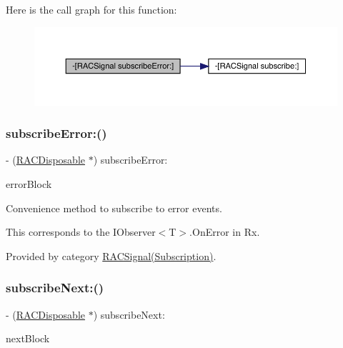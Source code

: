 Here is the call graph for this function\+:\nopagebreak
\begin{figure}[H]
\begin{center}
\leavevmode
\includegraphics[width=350pt]{interface_r_a_c_signal_a6e792da9c8499ad5791e14bd126e99cb_cgraph}
\end{center}
\end{figure}
\mbox{\label{interface_r_a_c_signal_a6e792da9c8499ad5791e14bd126e99cb}} 
\subsubsection{\texorpdfstring{subscribe\+Error\+:()}{subscribeError:()}\hspace{0.1cm}{\footnotesize\ttfamily [3/3]}}
{\footnotesize\ttfamily -\/ (\mbox{\hyperlink{interface_r_a_c_disposable}{R\+A\+C\+Disposable}} $\ast$) subscribe\+Error\+: \begin{DoxyParamCaption}\item[{(void($^\wedge$)(N\+S\+Error $\ast$error))}]{error\+Block }\end{DoxyParamCaption}}

Convenience method to subscribe to {\ttfamily error} events.

This corresponds to the {\ttfamily I\+Observer$<$T$>$.On\+Error} in Rx. 

Provided by category \mbox{\hyperlink{category_r_a_c_signal_07_subscription_08_a6e792da9c8499ad5791e14bd126e99cb}{R\+A\+C\+Signal(\+Subscription)}}.

\mbox{\label{interface_r_a_c_signal_a50d000f05e61411c438e616475deb7f8}} 
\subsubsection{\texorpdfstring{subscribe\+Next\+:()}{subscribeNext:()}\hspace{0.1cm}{\footnotesize\ttfamily [1/3]}}
{\footnotesize\ttfamily -\/ (\mbox{\hyperlink{interface_r_a_c_disposable}{R\+A\+C\+Disposable}} $\ast$) subscribe\+Next\+: \begin{DoxyParamCaption}\item[{(void($^\wedge$)(id x))}]{next\+Block }\end{DoxyParamCaption}}

